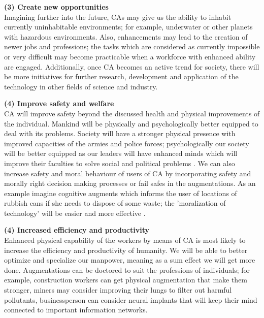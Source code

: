 {\bf (3) Create new opportunities}\\
Imagining further into the future, CAs may give us the ability to inhabit currently uninhabitable environments; for example, underwater or other planets with hazardous environments. Also, enhancements may lead to the creation of newer jobs and professions; the tasks which are considered as currently impossible or very difficult may become practicable when a workforce with enhanced ability are engaged. Additionally, once CA becomes an active trend for society, there will be more initiatives for further research, development and application of the technology in other fields of science and industry.

{\bf (4) Improve safety and welfare}\\
CA will improve safety beyond the discussed health and physical improvements of the individual. Mankind will be physically and psychologically better equipped to deal with its problems. Society will have a stronger physical presence with improved capacities of the armies and police forces; psychologically our society will be better equipped as our leaders will have enhanced minds which will improve their faculties to solve social and political problems \cite{bostrom2013ethical}. We can also increase safety and moral behaviour of users of CA by incorporating safety and morally right decision making processes or fail safes in the augmentations. As an example imagine cognitive augments which informs the user of locations of rubbish cans if she needs to dispose of some waste; the 'moralization of technology' will be easier and more effective \cite{achterhuis1995moralisering}.

{\bf (4) Increased efficiency and productivity} \\
Enhanced physical capability of the workers by means of CA is most likely to increase the efficiency and productivity of humanity. We will be able to better optimize and specialize our manpower, meaning as a sum effect we will get more done. Augmentations can be doctored to suit the professions of individuals; for example, construction workers can get physical augmentation that make them stronger, miners may consider improving their lungs to filter out harmful pollutants, businessperson can consider neural implants that will keep their mind connected to important information networks.

